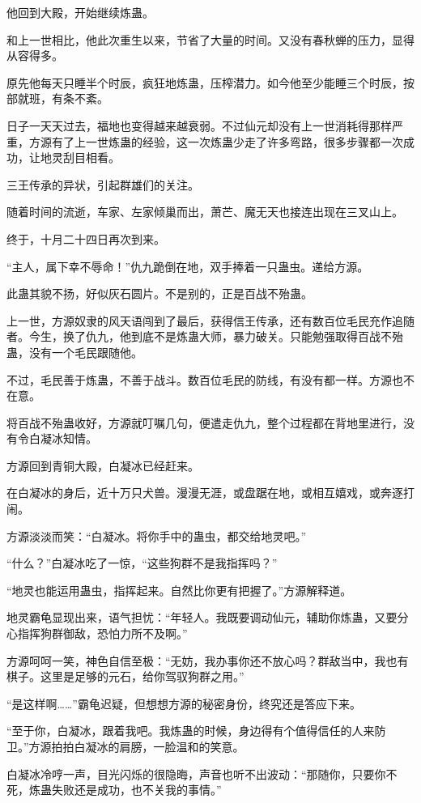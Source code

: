 \begin{this_body}
他回到大殿，开始继续炼蛊。

和上一世相比，他此次重生以来，节省了大量的时间。又没有春秋蝉的压力，显得从容得多。

原先他每天只睡半个时辰，疯狂地炼蛊，压榨潜力。如今他至少能睡三个时辰，按部就班，有条不紊。

日子一天天过去，福地也变得越来越衰弱。不过仙元却没有上一世消耗得那样严重，方源有了上一世炼蛊的经验，这一次炼蛊少走了许多弯路，很多步骤都一次成功，让地灵刮目相看。

三王传承的异状，引起群雄们的关注。

随着时间的流逝，车家、左家倾巢而出，萧芒、魔无天也接连出现在三叉山上。

终于，十月二十四日再次到来。

“主人，属下幸不辱命！”仇九跪倒在地，双手捧着一只蛊虫。递给方源。

此蛊其貌不扬，好似灰石圆片。不是别的，正是百战不殆蛊。

上一世，方源奴隶的风天语闯到了最后，获得信王传承，还有数百位毛民充作追随者。今生，换了仇九，他到底不是炼蛊大师，暴力破关。只能勉强取得百战不殆蛊，没有一个毛民跟随他。

不过，毛民善于炼蛊，不善于战斗。数百位毛民的防线，有没有都一样。方源也不在意。

将百战不殆蛊收好，方源就叮嘱几句，便遣走仇九，整个过程都在背地里进行，没有令白凝冰知情。

方源回到青铜大殿，白凝冰已经赶来。

在白凝冰的身后，近十万只犬兽。漫漫无涯，或盘踞在地，或相互嬉戏，或奔逐打闹。

方源淡淡而笑：“白凝冰。将你手中的蛊虫，都交给地灵吧。”

“什么？”白凝冰吃了一惊，“这些狗群不是我指挥吗？”

“地灵也能运用蛊虫，指挥起来。自然比你更有把握了。”方源解释道。

地灵霸龟显现出来，语气担忧：“年轻人。我既要调动仙元，辅助你炼蛊，又要分心指挥狗群御敌，恐怕力所不及啊。”

方源呵呵一笑，神色自信至极：“无妨，我办事你还不放心吗？群敌当中，我也有棋子。这里是足够的元石，给你驾驭狗群之用。”

“是这样啊……”霸龟迟疑，但想想方源的秘密身份，终究还是答应下来。

“至于你，白凝冰，跟着我吧。我炼蛊的时候，身边得有个值得信任的人来防卫。”方源拍拍白凝冰的肩膀，一脸温和的笑意。

白凝冰冷哼一声，目光闪烁的很隐晦，声音也听不出波动：“那随你，只要你不死，炼蛊失败还是成功，也不关我的事情。”


\end{this_body}
